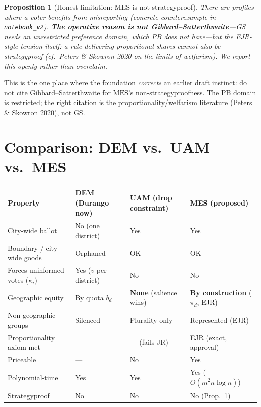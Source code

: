 \documentclass[11pt,letterpaper]{article}
\theoremstyle{definition}
\theoremstyle{plain}
\newtheorem{proposition}{Proposition}[section]
\theoremstyle{remark}
\newcommand{\budget}{b}            %
\newcommand{\votes}{v}             %
\newcommand{\popshare}{\pi}        %
\newcommand{\MES}{\mathrm{MES}}
\begin{document}
\begin{proposition}[Honest limitation: $\MES$ is not strategyproof]
\label{prop:notsp}
There are profiles where a voter benefits from misreporting (concrete counterexample in
\texttt{notebook\_v2}). \textbf{The operative reason is not Gibbard--Satterthwaite}---GS needs an
unrestricted preference domain, which PB does not have---but the EJR-style tension itself: a rule
delivering proportional shares cannot also be strategyproof (cf.\ Peters \& Skowron 2020 on the
limits of welfarism). We report this openly rather than overclaim.
\end{proposition}

\begin{watchout}
This is the one place where the foundation \emph{corrects} an earlier draft instinct: do not cite
Gibbard--Satterthwaite for $\MES$'s non-strategyproofness. The PB domain is restricted; the right
citation is the proportionality/welfarism literature (Peters \& Skowron 2020), not GS.
\end{watchout}

\section{Comparison: DEM vs.\ UAM vs.\ MES}
\label{sec:comparison}

\begin{center}\small\renewcommand{\arraystretch}{1.3}
\begin{tabularx}{\linewidth}{@{}lXXX@{}}
\toprule
\textbf{Property} & \textbf{DEM} (Durango now) & \textbf{UAM} (drop constraint) & \textbf{MES} (proposed) \\
\midrule
City-wide ballot          & No (one district) & Yes & Yes \\
Boundary / city-wide goods & Orphaned & OK & OK \\
Forces uninformed votes ($\kappa_i$) & Yes ($\votes$ per district) & No & No \\
Geographic equity         & By quota $\budget_d$ & \textbf{None} (salience wins) & \textbf{By construction} ($\popshare_d$, EJR) \\
Non-geographic groups     & Silenced & Plurality only & Represented (EJR) \\
Proportionality axiom met & --- & --- (fails JR) & EJR (exact, approval) \\
Priceable                 & --- & No & Yes \\
Polynomial-time           & Yes & Yes & Yes ($O(m^2n\log n)$) \\
Strategyproof             & No & No & No (Prop.~\ref{prop:notsp}) \\
\bottomrule
\end{tabularx}
\end{center}
\end{document}
